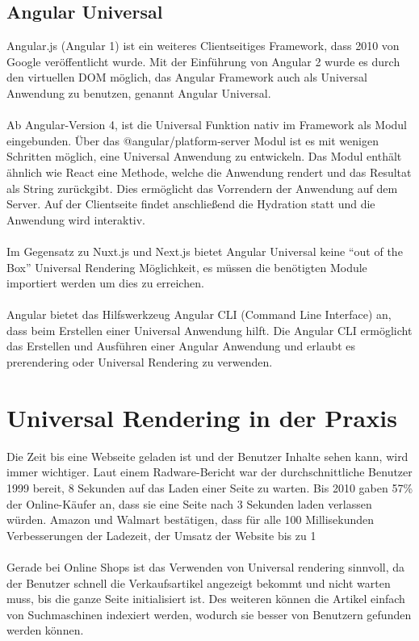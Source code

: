\documentclass[runningheads]{llncs}
\begin{document}
\subsection{Angular Universal}
\label{subsec:Angular Universal}
Angular.js (Angular 1) ist ein weiteres Clientseitiges Framework, 
dass 2010 von Google veröffentlicht wurde. 
Mit der Einführung von Angular 2 wurde es durch den virtuellen DOM möglich, 
das Angular Framework auch als Universal Anwendung zu benutzen, 
genannt Angular Universal. 
\\
\\
Ab Angular-Version 4, 
ist die Universal Funktion nativ im Framework als Modul eingebunden. 
Über das @angular/platform-server Modul ist es mit wenigen Schritten möglich, 
eine Universal Anwendung zu entwickeln. 
Das Modul enthält ähnlich wie React eine Methode, 
welche die Anwendung rendert und das Resultat als String zurückgibt. 
Dies ermöglicht das Vorrendern der Anwendung auf dem Server. 
Auf der Clientseite findet anschließend die Hydration statt und 
die Anwendung wird interaktiv. 
\\
\\
Im Gegensatz zu Nuxt.js und Next.js bietet Angular Universal keine 
“out of the Box” Universal Rendering Möglichkeit, 
es müssen die benötigten Module importiert werden um dies zu erreichen. 
\\
\\
Angular bietet das Hilfswerkzeug Angular CLI (Command Line Interface) an, 
dass beim Erstellen einer Universal Anwendung hilft. 
Die Angular CLI ermöglicht das Erstellen und Ausführen einer Angular Anwendung und 
erlaubt es prerendering oder Universal Rendering zu verwenden. 

\newpage

\section{Universal Rendering in der Praxis}
\label{sec:Universal Rendering in der Praxis}

Die Zeit bis eine Webseite geladen ist und der Benutzer Inhalte sehen kann, 
wird immer wichtiger. 
Laut einem Radware-Bericht war der durchschnittliche Benutzer 1999 bereit, 
8 Sekunden auf das Laden einer Seite zu warten. 
Bis 2010 gaben 57\% der Online-Käufer an, dass sie eine Seite nach 3 Sekunden laden verlassen würden. Amazon und Walmart bestätigen, dass für alle 100 Millisekunden Verbesserungen der Ladezeit, der Umsatz der Website bis zu 1%
\\
\\
Gerade bei Online Shops ist das Verwenden von Universal rendering sinnvoll, 
da der Benutzer schnell die Verkaufsartikel angezeigt bekommt und nicht warten muss, 
bis die ganze Seite initialisiert ist. 
Des weiteren können die Artikel einfach von Suchmaschinen indexiert werden, 
wodurch sie besser von Benutzern gefunden werden können.
\end{document}
